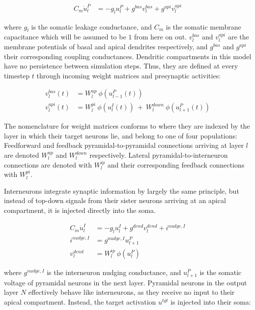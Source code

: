 \begin{align}
  C_m \dot{u}_l^P & = - g_l u_l^{P} + g^{bas} v_l^{bas} + g^{api} v_l^{api} \label{eq-pyr-dynamics-rate}
\end{align}

where $g_l$ is the somatic leakage conductance, and $C_m$ is the somatic membrane capacitance which will be assumed to
be $1$ from here on out. $v_l^{bas}$ and $v_l^{api}$ are the membrane potentials of basal and apical dendrites
respectively, and $g^{bas}$ and $g^{api}$ their corresponding coupling conductances.  Dendritic compartments in this
model have no persistence between simulation steps. Thus, they are defined at every timestep $t$ through incoming weight
matrices and presynaptic activities:

\begin{align}
  v_l^{bas}(t) & = W_l^{up} \ \phi(u_{l-1}^P(t)) \label{eq-v-bas-rate}                                     \\
  v_l^{api}(t) & =  W_l^{pi} \ \phi(u_l^I(t)) \ + \  W_l^{down} \ \phi(u_{l+1}^P(t)) \label{eq-v-api-rate}
\end{align}

The nomenclature for weight matrices conforms to \cite{Haider2021} where they are indexed by the layer in which their
target neurons lie, and belong to one of four populations: Feedforward and feedback pyramidal-to-pyramidal connections
arriving at layer $l$ are denoted $W_l^{up}$ and $W_l^{down}$ respectively. Lateral pyramidal-to-interneuron connections
are denoted with $W_l^{ip}$ and their corresponding feedback connections with $W_l^{pi}$.
\newline

Interneurons integrate synaptic information by largely the same principle, but instead of top-down signals from their
sister neurons arriving at an apical compartment, it is injected directly into the soma.

\begin{align}
  C_m \dot{u}_l^I & = - g_l u_l^{I} + g^{dend} v_l^{dend} + i^{nudge, I}\label{eq-intn-dynamics} \\
  i^{nudge, I}    & = g^{nudge, I} u_{l+1}^P                                                     \\
  v_l^{dend}      & = W_l^{ip} \ \phi(u_{l}^P)
\end{align}

where $ g^{nudge, I}$ is the interneuron nudging conductance, and $u_{l+1}^P$ is the somatic voltage of pyramidal
neurons in the next layer.  Pyramidal neurons in the output layer $N$ effectively behave like interneurons, as they
receive no input to their apical compartment. Instead, the target  activation $u^{tgt}$ is injected into their soma:


